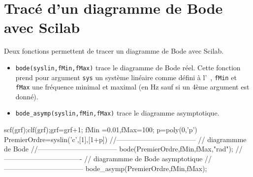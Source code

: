 \section{Tracé d'un diagramme de Bode avec Scilab}
Deux fonctions permettent de tracer un diagramme de Bode avec Scilab.
\begin{itemize}
    \item \verb?bode(syslin,fMin,fMax)? trace le diagramme de Bode réel. 
          Cette fonction prend pour argument \verb?sys? un système linéaire 
          comme défini à l'~, \verb?fMin? et \verb?fMax? 
          une fréquence minimal et maximal (en \si{\hertz} sauf si un 
          4ème argument est donné). 
    \item \verb?bode_asymp(syslin,fMin,fMax)? trace le diagramme asymptotique.
\end{itemize}
\begin{Scilabcode}
scf(grf);clf(grf);grf=grf+1;
fMin =0.01,fMax=100;
p=poly(0,'p')
PremierOrdre=syslin('c',[1],[1+p])
//-----------------------------------
// diagrammme de Bode
//-----------------------------------
bode(PremierOrdre,fMin,fMax,"rad");
// ----------------------------------
// diagrammme de Bode asymptotique
//-----------------------------------
bode_asymp(PremierOrdre,fMin,fMax);
\end{Scilabcode}
